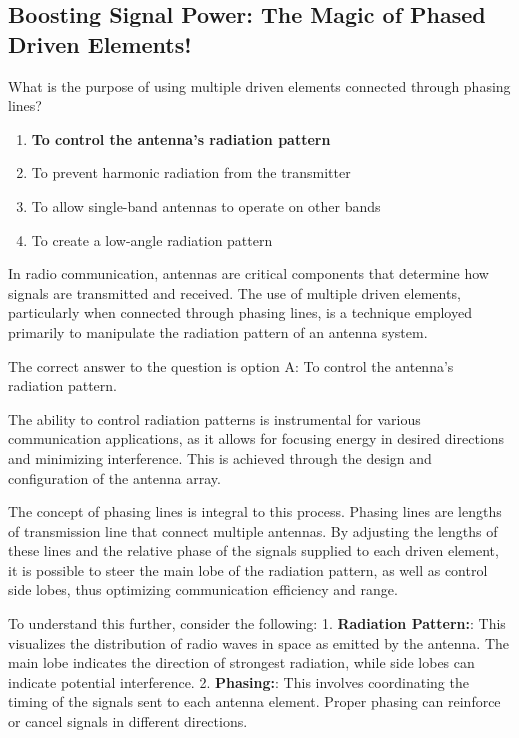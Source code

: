 \subsection{Boosting Signal Power: The Magic of Phased Driven Elements!}

\begin{tcolorbox}[colback=gray!10, colframe=black, title=E9E11] What is the purpose of using multiple driven elements connected through phasing lines?

\begin{enumerate}[label=(\Alph*)]
    \item \textbf{To control the antenna’s radiation pattern}
    \item To prevent harmonic radiation from the transmitter
    \item To allow single-band antennas to operate on other bands
    \item To create a low-angle radiation pattern
\end{enumerate} \end{tcolorbox}

In radio communication, antennas are critical components that determine how signals are transmitted and received. The use of multiple driven elements, particularly when connected through phasing lines, is a technique employed primarily to manipulate the radiation pattern of an antenna system.

The correct answer to the question is option A: To control the antenna’s radiation pattern. 

The ability to control radiation patterns is instrumental for various communication applications, as it allows for focusing energy in desired directions and minimizing interference. This is achieved through the design and configuration of the antenna array. 

The concept of phasing lines is integral to this process. Phasing lines are lengths of transmission line that connect multiple antennas. By adjusting the lengths of these lines and the relative phase of the signals supplied to each driven element, it is possible to steer the main lobe of the radiation pattern, as well as control side lobes, thus optimizing communication efficiency and range.

To understand this further, consider the following:
1. \textbf{Radiation Pattern:}: This visualizes the distribution of radio waves in space as emitted by the antenna. The main lobe indicates the direction of strongest radiation, while side lobes can indicate potential interference.
2. \textbf{Phasing:}: This involves coordinating the timing of the signals sent to each antenna element. Proper phasing can reinforce or cancel signals in different directions.
  
